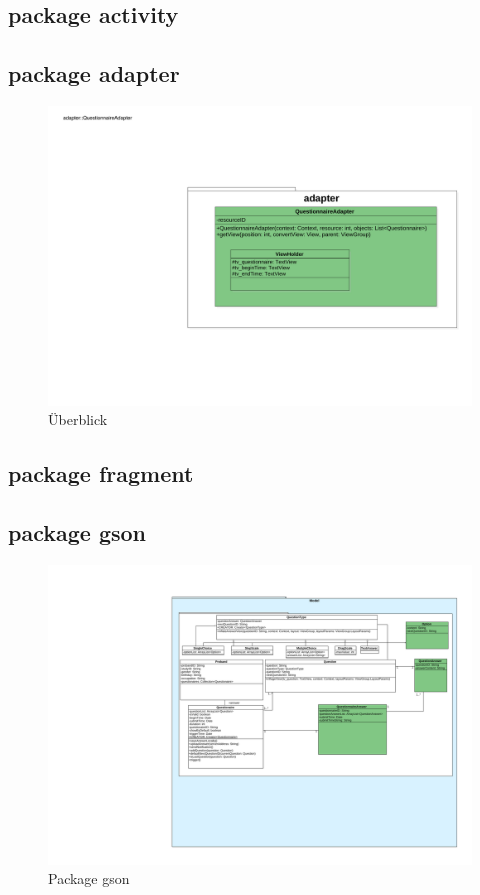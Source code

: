 \documentclass[a4paper]{scrreprt}
\begin{document}
            \subsection{package activity}

            \subsection{package adapter}

                \begin{figure}[H]
                    \centering
                    \includegraphics[scale = 0.8]{adpater.pdf}
                    \caption{Überblick}
                \end{figure}


            \subsection{package fragment}
            \subsection{package gson}
                \begin{figure}[H]
                    \centering
                    \includegraphics[scale = 0.8]{gson.pdf}
                    \caption{Package gson}
                \end{figure}
\end{document}
